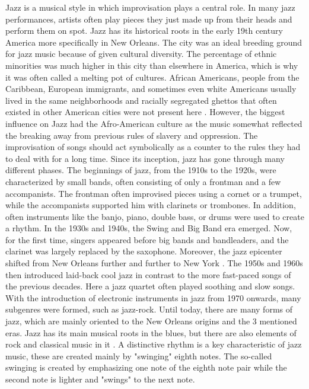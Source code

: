 Jazz is a musical style in which improvisation plays a central role.
In many jazz performances, artists often play pieces they just made up from their heads and
perform them on spot.
Jazz has its historical roots in the early 19th century America more specifically in New Orleans.
The city was an ideal breeding ground for jazz music because of given cultural diversity.
The percentage of ethnic minorities was much higher in this city than elsewhere in America,
which is why it was often called a melting pot of cultures. African Americans, people from the Caribbean,
European immigrants, and sometimes even white Americans usually lived in the same neighborhoods and racially
segregated ghettos that often existed in other American cities were not present here \cite{Beek2021Jazz}.
However, the biggest influence on Jazz had the Afro-American culture as the music somewhat
reflected the breaking away from previous rules of slavery and oppression.
The improvisation of songs should act symbolically as a counter to the rules they had to deal with for a
long time.
Since its inception, jazz has gone through many different phases.
The beginnings of jazz, from the 1910s to the 1920s, were characterized by small bands,
often consisting of only a frontman and a few accompanists.
The frontman often improvised pieces using a cornet or a trumpet,
while the accompanists supported him with clarinets or trombones.
In addition, often instruments like the banjo, piano, double bass, or drums were used to create a rhythm.
In the 1930s and 1940s, the Swing and Big Band era emerged.
Now, for the first time, singers appeared before big bands and bandleaders,
and the clarinet was largely replaced by the saxophone.
Moreover, the jazz epicenter shifted from New Orleans further and further to New York \cite{Wildridge2020}.
The 1950s and 1960s then introduced laid-back cool jazz in contrast to the more fast-paced songs
of the previous decades.
Here a jazz quartet often played soothing and slow songs. With the introduction of electronic
instruments in jazz from 1970 onwards, many subgenres were formed, such as jazz-rock.
Until today, there are many forms of jazz, which are mainly oriented to the New Orleans origins
and the 3 mentioned eras.
Jazz has its main musical roots in the blues, but there are also elements of rock and classical music in it \cite{JazzAmHistory}.
A distinctive rhythm is a key characteristic of jazz music,
these are created mainly by "swinging" eighth notes.
The so-called swinging is created by emphasizing one note of the eighth note pair while the second
note is lighter and "swings" to the next note.
